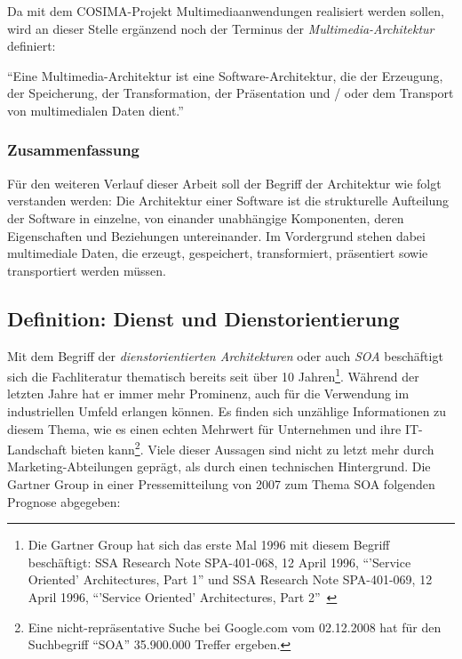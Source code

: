   Da mit dem COSIMA-Projekt Multimediaanwendungen realisiert werden sollen, wird an dieser Stelle ergänzend noch der Terminus der \emph{Multimedia-Architektur} definiert:
  
  \begin{definition}\label{def:multimedia_architektur}
    "`Eine Multimedia-Architektur ist eine Software-Architektur, die der Erzeugung, der Speicherung, der Transformation, der Präsentation und / oder dem Transport von multimedialen Daten dient."'~\emph{\citep[S. 423]{handbuch_der_software_architektur}}
  \end{definition}


\subsubsection{Zusammenfassung} %
\label{ssub:zusammenfassung}

  Für den weiteren Verlauf dieser Arbeit soll der Begriff der Architektur wie folgt verstanden werden: Die Architektur einer Software ist die strukturelle Aufteilung der Software in einzelne, von einander unabhängige Komponenten, deren Eigenschaften und Beziehungen untereinander. Im Vordergrund stehen dabei multimediale Daten, die erzeugt, gespeichert, transformiert, präsentiert sowie transportiert werden müssen.



\subsection{Definition: Dienst und Dienstorientierung} %
\label{sub:definition_dienst_und_dienstorientierung}

  Mit dem Begriff der \emph{dienstorientierten Architekturen} oder auch \emph{SOA} beschäftigt sich die Fachliteratur thematisch bereits seit über 10 Jahren\footnote{Die Gartner Group hat sich das erste Mal 1996 mit diesem Begriff beschäftigt: SSA Research Note SPA-401-068, 12 April 1996, "`'Service Oriented' Architectures, Part 1"' und SSA Research Note SPA-401-069, 12 April 1996, "`'Service Oriented' Architectures, Part 2"'~\citep{natis2003soa}}. Während der letzten Jahre hat er immer mehr Prominenz, auch für die Verwendung im industriellen Umfeld erlangen können. Es finden sich unzählige Informationen zu diesem Thema, wie es einen echten Mehrwert für Unternehmen und ihre IT-Landschaft bieten kann\footnote{Eine nicht-repräsentative Suche bei Google.com vom 02.12.2008 hat für den Suchbegriff "`SOA"' 35.900.000 Treffer ergeben.}. Viele dieser Aussagen sind nicht zu letzt mehr durch Marketing-Abteilungen geprägt, als durch einen technischen Hintergrund. Die Gartner Group in einer Pressemitteilung von 2007 zum Thema SOA folgenden Prognose abgegeben:
  
